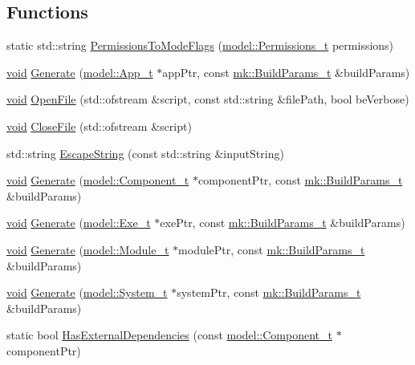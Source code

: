 \subsection*{Functions}
\begin{DoxyCompactItemize}
\item 
static std\+::string \hyperlink{namespaceninja_affd6db992c958f6a102fab18786fe8a2}{Permissions\+To\+Mode\+Flags} (\hyperlink{structmodel_1_1_permissions__t}{model\+::\+Permissions\+\_\+t} permissions)
\item 
\hyperlink{_t_e_m_p_l_a_t_e__cdef_8h_ac9c84fa68bbad002983e35ce3663c686}{void} \hyperlink{namespaceninja_a09e306ee7633de552e4384a80ede442f}{Generate} (\hyperlink{structmodel_1_1_app__t}{model\+::\+App\+\_\+t} $\ast$app\+Ptr, const \hyperlink{structmk_1_1_build_params__t}{mk\+::\+Build\+Params\+\_\+t} \&build\+Params)
\item 
\hyperlink{_t_e_m_p_l_a_t_e__cdef_8h_ac9c84fa68bbad002983e35ce3663c686}{void} \hyperlink{namespaceninja_a70c8cd10e0bd28a90f6dcd999b78d5e4}{Open\+File} (std\+::ofstream \&script, const std\+::string \&file\+Path, bool be\+Verbose)
\item 
\hyperlink{_t_e_m_p_l_a_t_e__cdef_8h_ac9c84fa68bbad002983e35ce3663c686}{void} \hyperlink{namespaceninja_a61265f2574615609184e9c7f58b40ed7}{Close\+File} (std\+::ofstream \&script)
\item 
std\+::string \hyperlink{namespaceninja_ab914fe5e66e150d59877d7c478286ca7}{Escape\+String} (const std\+::string \&input\+String)
\item 
\hyperlink{_t_e_m_p_l_a_t_e__cdef_8h_ac9c84fa68bbad002983e35ce3663c686}{void} \hyperlink{namespaceninja_a7fdd7c72feed390f6c9ffa8ad4b4ca11}{Generate} (\hyperlink{structmodel_1_1_component__t}{model\+::\+Component\+\_\+t} $\ast$component\+Ptr, const \hyperlink{structmk_1_1_build_params__t}{mk\+::\+Build\+Params\+\_\+t} \&build\+Params)
\item 
\hyperlink{_t_e_m_p_l_a_t_e__cdef_8h_ac9c84fa68bbad002983e35ce3663c686}{void} \hyperlink{namespaceninja_ab54226febc3bef504ecd719b460ba4b3}{Generate} (\hyperlink{structmodel_1_1_exe__t}{model\+::\+Exe\+\_\+t} $\ast$exe\+Ptr, const \hyperlink{structmk_1_1_build_params__t}{mk\+::\+Build\+Params\+\_\+t} \&build\+Params)
\item 
\hyperlink{_t_e_m_p_l_a_t_e__cdef_8h_ac9c84fa68bbad002983e35ce3663c686}{void} \hyperlink{namespaceninja_a3d9bc14bb6328d52cbbc6ee95ceb73be}{Generate} (\hyperlink{structmodel_1_1_module__t}{model\+::\+Module\+\_\+t} $\ast$module\+Ptr, const \hyperlink{structmk_1_1_build_params__t}{mk\+::\+Build\+Params\+\_\+t} \&build\+Params)
\item 
\hyperlink{_t_e_m_p_l_a_t_e__cdef_8h_ac9c84fa68bbad002983e35ce3663c686}{void} \hyperlink{namespaceninja_afb7881520f9e1476786538e46eb177e4}{Generate} (\hyperlink{structmodel_1_1_system__t}{model\+::\+System\+\_\+t} $\ast$system\+Ptr, const \hyperlink{structmk_1_1_build_params__t}{mk\+::\+Build\+Params\+\_\+t} \&build\+Params)
\item 
static bool \hyperlink{namespaceninja_a68ae14ce554988807f95b7daa324cca8}{Has\+External\+Dependencies} (const \hyperlink{structmodel_1_1_component__t}{model\+::\+Component\+\_\+t} $\ast$component\+Ptr)
\end{DoxyCompactItemize}


